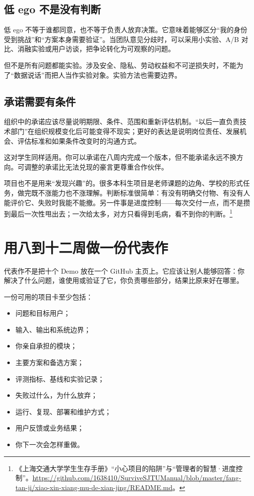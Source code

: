 \documentclass[UTF8,zihao=5,openany]{ctexbook}
\begin{document}
\subsection{低 ego 不是没有判断}
低 ego 不等于谁都同意，也不等于负责人放弃决策。它意味着能够区分“我的身份受到挑战”和“方案本身需要验证”。当团队意见分歧时，可以采用小实验、A/B 对比、消融实验或用户访谈，把争论转化为可观察的问题。

但不是所有问题都能实验。涉及安全、隐私、劳动权益和不可逆损失时，不能为了“数据说话”而把人当作实验对象。实验方法也需要边界。

\subsection{承诺需要有条件}
组织中的承诺应该尽量说明期限、条件、范围和重新评估机制。“以后一直负责技术部门”在组织规模变化后可能变得不现实；更好的表达是说明岗位责任、发展机会、评估标准和如果条件改变时的沟通方式。

这对学生同样适用。你可以承诺在八周内完成一个版本，但不能承诺永远不换方向。可调整的承诺比无法兑现的豪言更尊重合作伙伴。

项目也不是用来“发现兴趣”的。很多本科生项目是老师课题的边角、学校的形式任务，做完既不涨能力也不涨理解。判断标准很简单：有没有明确交付物、有没有人能评价它、失败时我能不能撤。另一件事是进度控制——每次交付一点，而不是攒到最后一次性甩出去；一次给太多，对方只看得到毛病，看不到你的判断。\footnote{《上海交通大学学生生存手册》“小心项目的陷阱”与“管理者的智慧·进度控制”。\url{https://github.com/1638410/SurviveSJTUManual/blob/master/fang-tan-ji/xiao-xin-xiang-mu-de-xian-jing/README.md}。}

\section{用八到十二周做一份代表作}
代表作不是把十个 Demo 放在一个 GitHub 主页上。它应该让别人能够回答：你解决了什么问题，谁使用或验证了它，你负责哪些部分，结果比原来好在哪里。

一份可用的项目卡至少包括：
\begin{itemize}
\item 问题和目标用户；
\item 输入、输出和系统边界；
\item 你亲自承担的模块；
\item 主要方案和备选方案；
\item 评测指标、基线和实验记录；
\item 失败过什么，为什么放弃；
\item 运行、复现、部署和维护方式；
\item 用户反馈或业务结果；
\item 你下一次会怎样重做。
\end{itemize}
\end{document}
